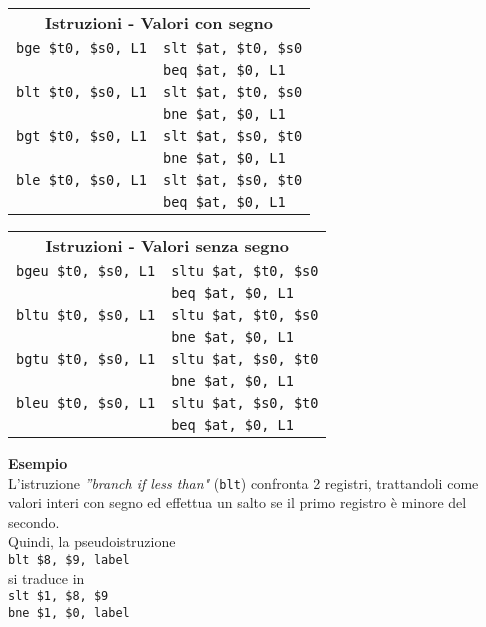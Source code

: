 \documentclass[../main.tex]{subfiles}
\begin{document}
\begin{table}[h!]
    \begin{minipage}{.5\linewidth}
        \begin{tabular}{ l l }
            \multicolumn{2}{c}{\textbf{Istruzioni - Valori con segno}} \\
            \texttt{bge \$t0, \$s0, L1} & \texttt{slt \$at, \$t0, \$s0} \\
            & \texttt{beq \$at, \$0, L1} \\
            \texttt{blt \$t0, \$s0, L1} & \texttt{slt \$at, \$t0, \$s0} \\
            & \texttt{bne \$at, \$0, L1} \\
            \texttt{bgt \$t0, \$s0, L1} & \texttt{slt \$at, \$s0, \$t0} \\
            & \texttt{bne \$at, \$0, L1} \\
            \texttt{ble \$t0, \$s0, L1} & \texttt{slt \$at, \$s0, \$t0} \\
            & \texttt{beq \$at, \$0, L1} \\
        \end{tabular}
    \end{minipage}
    \begin{minipage}{.5\linewidth}
        \begin{tabular}{ l l }
            \multicolumn{2}{c}{\textbf{Istruzioni - Valori senza segno}} \\
            \texttt{bgeu \$t0, \$s0, L1} & \texttt{sltu \$at, \$t0, \$s0} \\
            & \texttt{beq \$at, \$0, L1} \\
            \texttt{bltu \$t0, \$s0, L1} & \texttt{sltu \$at, \$t0, \$s0} \\
            & \texttt{bne \$at, \$0, L1} \\
            \texttt{bgtu \$t0, \$s0, L1} & \texttt{sltu \$at, \$s0, \$t0} \\
            & \texttt{bne \$at, \$0, L1} \\
            \texttt{bleu \$t0, \$s0, L1} & \texttt{sltu \$at, \$s0, \$t0} \\
            & \texttt{beq \$at, \$0, L1} \\
        \end{tabular}
    \end{minipage}
\end{table}

\noindent
\textbf{Esempio} \\
L'istruzione \textit{''branch if less than"} (\texttt{blt})
confronta 2 registri, trattandoli come valori interi con segno
ed effettua un salto se il primo registro è minore del secondo. \\
Quindi, la pseudoistruzione \\
\texttt{\hspace*{5mm}blt \$8, \$9, label} \\
si traduce in \\
\texttt{\hspace*{5mm}slt \$1, \$8, \$9} \\
\texttt{\hspace*{5mm}bne \$1, \$0, label} \\
\end{document}
